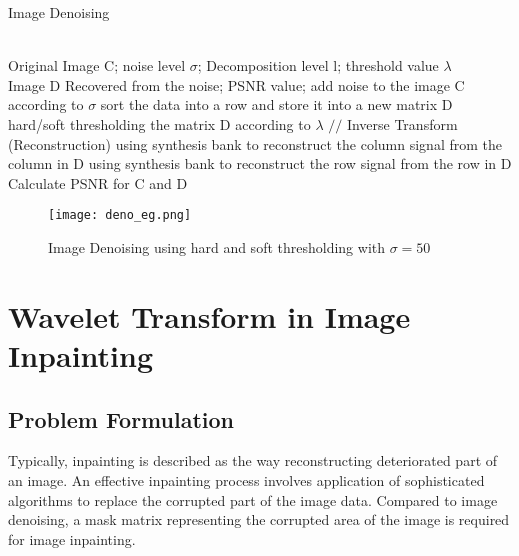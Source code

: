 \begin{algorithm}  
\caption{Image Denoising}  
\label{alg:2}  
\begin{algorithmic}
\REQUIRE ~~\\ %
Original Image C; noise level $\sigma$; Decomposition level l; threshold value $\lambda$
\ENSURE ~~\\ %
Image D Recovered from the noise; PSNR value;
\STATE add noise to the image C according to $\sigma$
\STATE sort the data into a row and store it into a new matrix D
\ENDFOR
{}
\ENDFOR
\STATE hard/soft thresholding the matrix D according to $\lambda$
\STATE $//$ Inverse Transform (Reconstruction)
\STATE using synthesis bank to reconstruct the column signal from the column in D
\ENDFOR
{}
\STATE using synthesis bank to reconstruct the row signal from the row in D
\ENDFOR
\STATE Calculate PSNR for C and D
\end{algorithmic}  
\end{algorithm}  

\begin{figure}[h]
\centering
\texttt{[image: deno\_eg.png]}
\caption{Image Denoising using hard and soft thresholding with $\sigma = 50$}
\end{figure}



\newpage
\section{Wavelet Transform in Image Inpainting}

\subsection{Problem Formulation}
Typically, inpainting is described as the way reconstructing deteriorated part of an image. An effective inpainting process involves application of sophisticated algorithms to replace the corrupted part of the image data. Compared to image denoising, a mask matrix representing the corrupted area of the image is required for image inpainting.

